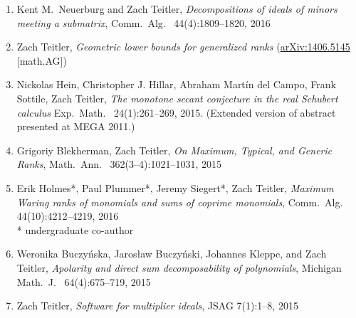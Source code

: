 \documentclass[12pt]{article}
\begin{document}
\begin{enumerate}
\item Kent M.\ Neuerburg and Zach Teitler,
\emph{Decompositions of ideals of minors meeting a submatrix},
Comm.\ Alg.\
44(4):1809--1820, 2016

\item Zach Teitler,
\emph{Geometric lower bounds for generalized ranks} %
(\href{http://arxiv.org/abs/1406.5145}{arXiv:1406.5145} [math.AG])

\item Nickolas Hein, Christopher J. Hillar, Abraham Mart\'in del Campo, Frank Sottile, Zach Teitler,
\emph{The monotone secant conjecture in the real Schubert calculus}
Exp.\ Math.\
24(1):261--269, 2015.
(Extended version of abstract presented at MEGA 2011.)

\item Grigoriy Blekherman, Zach Teitler,
\emph{On Maximum, Typical, and Generic Ranks},
Math.\ Ann.\
362(3--4):1021--1031, 2015

\item Erik Holmes*, Paul Plummer*, Jeremy Siegert*, Zach Teitler,
\emph{Maximum Waring ranks of monomials and sums of coprime monomials},
Comm.\ Alg.\
44(10):4212--4219, 2016\\
* undergraduate co-author

\item Weronika Buczy\'nska, Jaros{\l}aw Buczy\'nski, Johannes Kleppe, and Zach Teitler,
\emph{Apolarity and direct sum decomposability of polynomials},
Michigan Math.\ J.\
64(4):675--719, 2015

\item Zach Teitler,
\emph{Software for multiplier ideals},
JSAG
7(1):1--8, 2015


\end{enumerate}
\end{document}
